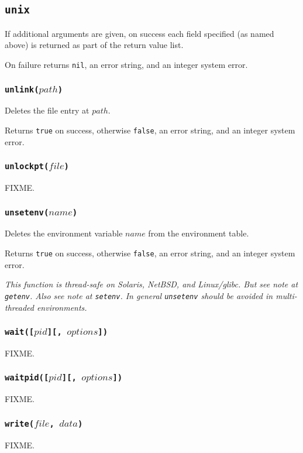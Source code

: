 \documentclass[11pt, oneside]{memoir}
\newcommand*{\true}[0]{\texttt{true}\xspace}
\newcommand*{\false}[0]{\texttt{false}\xspace}
\newcommand*{\nil}[0]{\texttt{nil}\xspace}
\newcommand*{\fn}[1]{\texttt{#1}\xspace}
\newcounter{toccols}
\newenvironment{Module}[1]{
	\subsection{\texttt{#1}}
	\addtocontents{toc}{
		\protect\begin{multicols}{\value{toccols}}
	}
}{
	\addtocontents{toc}{\protect\end{multicols}}
}
\begin{document}
\begin{Module}{unix}
If additional arguments are given, on success each field specified (as named above) is returned as part of the return value list.

On failure returns \nil, an error string, and an integer system error.

\subsubsection[\fn{unlink}]{\fn{unlink($path$)}}

Deletes the file entry at $path$.

Returns \true on success, otherwise \false, an error string, and an integer system error. 

\subsubsection[\fn{unlockpt}]{\fn{unlockpt($file$)}}

FIXME.

\subsubsection[\fn{unsetenv}]{\fn{unsetenv($name$)}}

Deletes the environment variable $name$ from the environment table.

Returns \true on success, otherwise \false, an error string, and an integer system error.

\emph{This function is thread-safe on Solaris, NetBSD, and Linux/glibc. But see note at \fn{getenv}. Also see note at \fn{setenv}. In general \fn{unsetenv} should be avoided in multi-threaded environments.}

\subsubsection[\fn{wait}]{\fn{wait([$pid$][, $options$])}}

FIXME.

\subsubsection[\fn{waitpid}]{\fn{waitpid([$pid$][, $options$])}}

FIXME.

\subsubsection[\fn{write}]{\fn{write($file$, $data$)}}

FIXME.

\end{Module}
\end{document}
